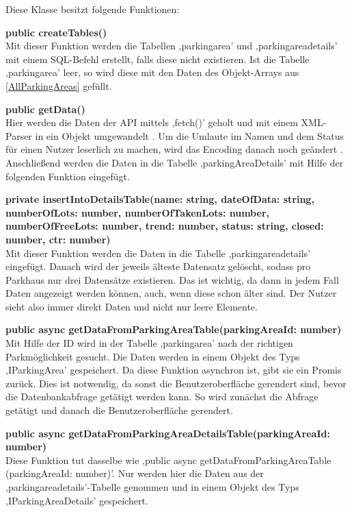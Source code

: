 Diese Klasse besitzt folgende Funktionen:
\begin{description}
	\item \textbf{public createTables()} \\ Mit dieser Funktion werden die Tabellen ,parkingarea' und ,parkingareadetails' mit einem SQL-Befehl erstellt, falls diese nicht existieren. Ist die Tabelle ,parkingarea' leer, so wird diese mit den Daten des Objekt-Arrays aus \autoref{AllParkingAreas} gefüllt.
	\item \textbf{public getData()} \\ Hier werden die Daten der API mittels ,fetch()' geholt und mit einem XML-Parser in ein Objekt umgewandelt \cite{xmlParser}. Um die Umlaute im Namen und dem Status für einen Nutzer leserlich zu machen, wird das Encoding danach noch geändert \cite{htmlEntities}. Anschließend werden die Daten in die Tabelle ,parkingAreaDetails' mit Hilfe der folgenden Funktion eingefügt.
	\item \textbf{private insertIntoDetailsTable(name: string, dateOfData: string, numberOfLots: number, numberOfTakenLots: number, numberOfFreeLots: number, trend: number, status: string, closed: number, ctr: number)} \\ Mit dieser Funktion werden die Daten in die Tabelle ,parkingareadetails' eingefügt. Danach wird der jeweils älteste Datensatz gelöscht, sodass pro Parkhaus nur drei Datensätze existieren. Das ist wichtig, da dann in jedem Fall Daten angezeigt werden können, auch, wenn diese schon älter sind. Der Nutzer sieht also immer direkt Daten und nicht nur leere Elemente.
	\item \textbf{public async getDataFromParkingAreaTable(parkingAreaId: number)} \\ Mit Hilfe der ID wird in der Tabelle ,parkingarea' nach der richtigen Parkmöglichkeit gesucht. Die Daten werden in einem Objekt des Typs ,IParkingArea' gespeichert. Da diese Funktion asynchron ist, gibt sie ein Promis zurück. Dies ist notwendig, da sonst die Benutzeroberfläche gerendert sind, bevor die Datenbankabfrage getätigt werden kann. So wird zunächst die Abfrage getätigt und danach die Benutzeroberfläche gerendert.
	\item \textbf{public async getDataFromParkingAreaDetailsTable(parkingAreaId: number)} \\ Diese Funktion tut dasselbe wie ,public async getDataFromParkingAreaTable (parkingAreaId: number)'. Nur werden hier die Daten aus der ,parkingareadetails'-Tabelle genommen und in einem Objekt des Typs ,IParkingAreaDetails' gespeichert.

\end{description}
